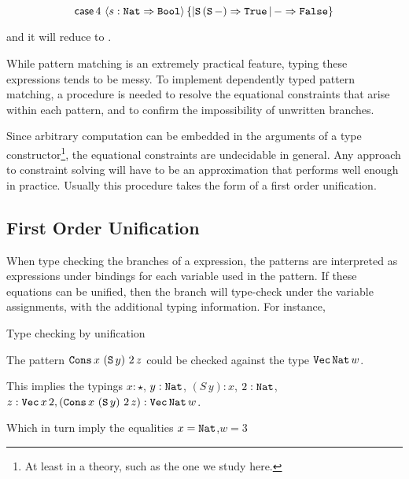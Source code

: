 \[
\mathsf{case}{}\,4\,\left\langle s:\mathtt{Nat}{}\Rightarrow\mathtt{Bool}{}\right\rangle \left\{ |\mathtt{S}{}\left(\mathtt{S}{}\,-\right)\Rightarrow \mathtt{True}{}\,|\,-\Rightarrow \mathtt{False}{}\right\} 
\]

and it will reduce to \True{}.

While pattern matching is an extremely practical feature, typing these expressions tends to be messy.
To implement dependently typed pattern matching, a procedure is needed to resolve the equational constraints that arise within each pattern, and to confirm the impossibility of unwritten branches.

Since arbitrary computation can be embedded in the arguments of a type constructor\footnote{
  At least in a \fullSp{} theory, such as the one we study here.
}, the equational constraints are undecidable in general.
Any approach to constraint solving will have to be an approximation that performs well enough in practice.
Usually this procedure takes the form of a first order unification. 




\subsection{First Order Unification}

When type checking the branches of a \case{} expression, the patterns are interpreted as expressions under bindings for each variable used in the pattern.
If these equations can be unified, then the branch will type-check under the variable assignments, with the additional typing information.
For instance,
\begin{example}
Type checking by unification

The pattern $\mathtt{Cons}{}\,x\,\left(\mathtt{S}{}\,y\right)\,2\,z$ could be checked against the type $\mathtt{Vec}{}\,\mathtt{Nat}{}\,w$.

This implies the typings $x:\star$, $y:\mathtt{Nat}{}$, $\left(S\,y\right):x$, $2:\mathtt{Nat}{}$, $z:\mathtt{Vec}{}\,x\,2,\left(\mathtt{Cons}{}\,x\,\left(\mathtt{S}{}\,y\right)\,2\,z\right):\mathtt{Vec}{}\,\mathtt{Nat}{}\,w$.

Which in turn imply the equalities $x=\mathtt{Nat}{}$,$w=3$
\end{example}

